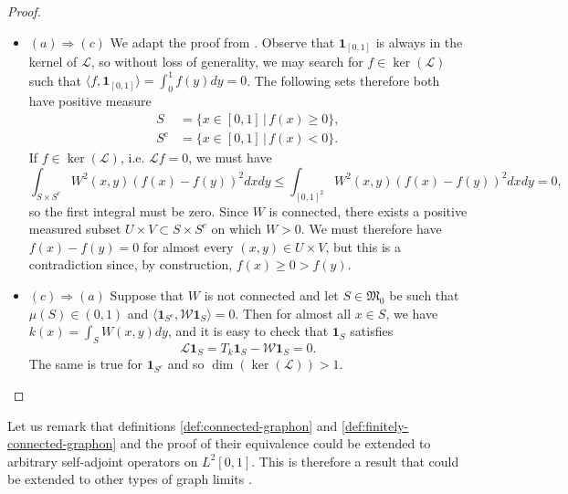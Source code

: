 \documentclass[11pt]{article}
\def\N{\mathbb{N}}
\def\ker{\operatorname{ker}}
\def\dim{\operatorname{dim}}
\def\II{\bm{1}}
\def\calW{\mathcal{W}}
\def\calL{\mathcal{L}}
\def\frakM{\mathfrak{M}_0}
\theoremstyle{definition}
\begin{document}
\begin{proof}
\begin{itemize}
        Finally, we may write
        \begin{align*}
            \langle \II_{U_\infty}, \II_{V_\infty} \rangle &= \sum_{k,m \in \N} \langle \II_{\overline{U}_m}, \II_{\overline{V}_k} \rangle = 0.
        \end{align*}
        And because $U_\infty$ and $V_\infty$ are closed under taking neighborhoods, we have
        $$ \langle \II_{U^c_\infty}, \calW \II_{U_\infty} \rangle = 0, $$
        so taking $U_\infty$ suffices to show that $W$ is not connected, as $V \subset V_\infty \subset U_\infty^c$, so $\mu(U_\infty^c) > 0$.
        \item $(a)\Rightarrow (c)$ We adapt the proof from \cite{Petit2019RandomWO}. Observe that $\II_{[0,1]}$ is always in the kernel of $\calL$, so without loss of generality, we may search for $f \in \ker(\calL)$ such that $\langle f,\II_{[0,1]} \rangle = \int_0^1 f(y) dy = 0$. The following sets therefore both have positive measure
        \begin{align*}
            S &= \{x \in [0,1]\,|\, f(x) \ge 0\},\\
            S^c &= \{x \in [0,1]\,|\, f(x) < 0\}.
        \end{align*}
        If $f \in \ker (\calL)$, i.e. $\calL f = 0$, we must have
        $$ \int_{S\times S^c} W^2(x,y) (f(x)-f(y))^2 dx dy \le \int_{[0,1]^2} W^2(x,y) (f(x)-f(y))^2 dx dy = 0,
        $$
        so the first integral must be zero. Since $W$ is connected, there exists a positive measured subset $U \times V \subset S \times S^c$ on which $W>0$. We must therefore have $f(x)-f(y)=0$ for almost every $(x,y) \in U\times V$, but this is a contradiction since, by construction, $f(x) \ge 0 > f(y)$.
        \item $(c)\Rightarrow (a)$ Suppose that $W$ is not connected and let $S \in \frakM$ be such that $\mu(S) \in (0,1)$ and $\langle \II_{S^c}, \calW \II_S \rangle = 0$. Then for almost all $x \in S$, we have $k(x) = \int_{S} W(x,y) dy$, and it is easy to check that $\II_S$ satisfies $$ \calL \II_S = T_k \II_S - \calW \II_S = 0. $$ The same is true for $\II_{S^c}$ and so $\dim(\ker(\calL)) > 1$.
    \end{itemize}
\end{proof}

Let us remark that definitions \ref{def:connected-graphon} and \ref{def:finitely-connected-graphon} and the proof of their equivalence could be extended to arbitrary self-adjoint operators on $L^2 [0,1]$. This is therefore a result that could be extended to other types of graph limits \cite{backhauszActionConvergenceOperators2022}.
\end{document}
